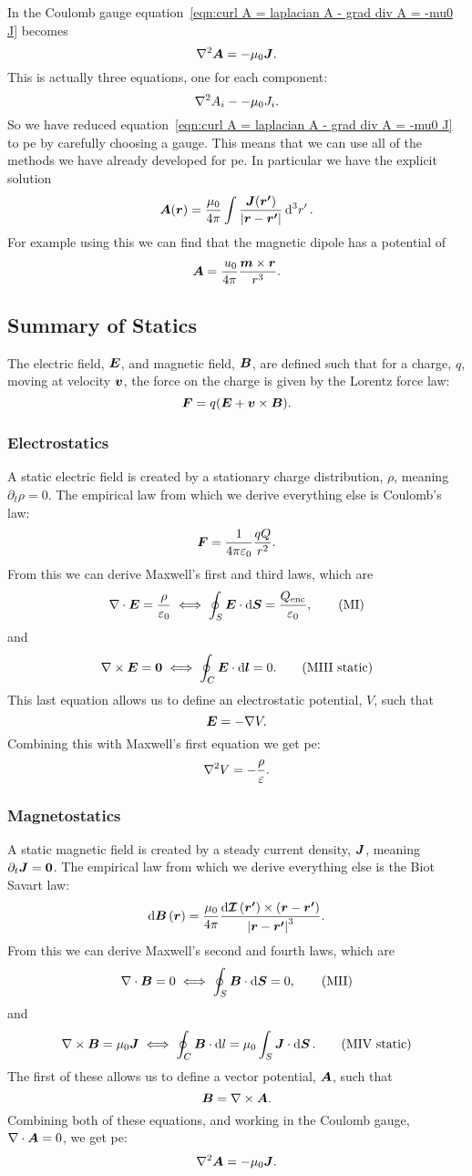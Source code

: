     In the Coulomb gauge equation~\ref{eqn:curl A = laplacian A - grad div A = -mu0 J} becomes
    \[\nabla^2\bm{A} = -\mu_0\bm{J}.\]
    This is actually three equations, one for each component:
    \[\nabla^2 A_i - -\mu_0 J_i.\]
    So we have reduced equation~\ref{eqn:curl A = laplacian A - grad div A = -mu0 J} to \gls{pe} by carefully choosing a gauge.
    This means that we can use all of the methods we have already developed for \gls{pe}.
    In particular we have the explicit solution
    \[\bm{A}(\bm{r}) = \frac{\mu_0}{4\pi}\int\frac{\bm{J}(\bm{r'})}{\abs{\bm{r} - \bm{r'}}}\dd[3]{r'}.\]
    For example using this we can find that the magnetic dipole has a potential of
    \[\bm{A} = \frac{\,u_0}{4\pi}\frac{\bm{m}\times\bm{r}}{r^3}.\]
    
    \subsection{Summary of Statics}
    The electric field, \(\bm{E}\), and magnetic field, \(\bm{B}\), are defined such that for a charge, \(q\), moving at velocity \(\bm{v}\), the force on the charge is given by the Lorentz force law:
    \[\bm{F} = q(\bm{E} + \bm{v}\times\bm{B}).\]
    
    \subsubsection{Electrostatics}
    A static electric field is created by a stationary charge distribution, \(\rho\), meaning \(\partial_t\rho = 0\).
    The empirical law from which we derive everything else is Coulomb's law:
    \[\bm{F} = \frac{1}{4\pi\varepsilon_0}\frac{qQ}{r^2}.\]
    From this we can derive Maxwell's first and third laws, which are
    \[\nabla\cdot\bm{E} = \frac{\rho}{\varepsilon_0} \iff \oint_S\bm{E}\cdot\dd{\bm{S}} = \frac{Q_{\mathrm{enc}}}{\varepsilon_0},\tag{MI}\]
    and
    \[\nabla\times\bm{E} = \bm{0} \iff \oint_C\bm{E}\cdot\dd{\bm{l}} = 0.\tag{MIII static}\]
    This last equation allows us to define an electrostatic potential, \(V\), such that
    \[\bm{E} = -\nabla V.\]
    Combining this with Maxwell's first equation we get \gls{pe}:
    \[\nabla^2 V = -\frac{\rho}{\varepsilon}.\]
    
    \subsubsection{Magnetostatics}
    A static magnetic field is created by a steady current density, \(\bm{J}\), meaning \(\partial_t\bm{J} = \bm{0}\).
    The empirical law from which we derive everything else is the Biot Savart law:
    \[\dd{\bm{B}}(\bm{r}) = \frac{\mu_0}{4\pi}\frac{\dd{\bm{\mathcal{I}}}(\bm{r'})\times(\bm{r} - \bm{r'})}{\abs{\bm{r} - \bm{r'}}^3}.\]
    From this we can derive Maxwell's second and fourth laws, which are
    \[\nabla\cdot\bm{B} = 0 \iff \oint_S\bm{B}\cdot\dd{\bm{S}} = 0,\tag{MII}\]
    and
    \[\nabla\times\bm{B} = \mu_0\bm{J} \iff \oint_C\bm{B}\cdot\dd{l} = \mu_0\int_S\bm{J}\cdot\dd{\bm{S}}.\tag{MIV static}\]
    The first of these allows us to define a vector potential, \(\bm{A}\), such that
    \[\bm{B} = \nabla\times\bm{A}.\]
    Combining both of these equations, and working in the Coulomb gauge, \(\nabla\cdot\bm{A} = 0\), we get \gls{pe}:
    \[\nabla^2\bm{A} = -\mu_0\bm{J}.\]